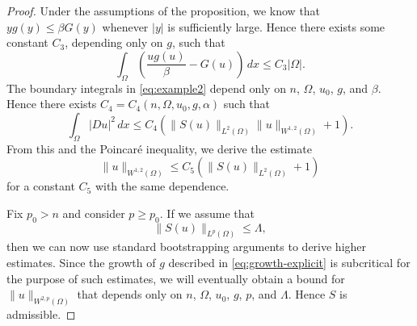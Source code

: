 \documentclass[a4paper]{article}
\theoremstyle{remark}
\begin{document}
\begin{proof}
Under the assumptions of the proposition, we know that $yg(y) \le \beta G(y)$ whenever $|y|$ is sufficiently large.
Hence there exists some constant $C_3$, depending only on $g$, such that
\[
\int_\Omega \left(\frac{u g(u)}{\beta} - G(u)\right) \, dx \le C_3 |\Omega|.
\]
The boundary integrals in \eqref{eq:example2} depend only on $n$, $\Omega$,
$u_0$, $g$, and $\beta$. Hence there exists $C_4 = C_4(n, \Omega, u_0, g, \alpha)$
such that
\[
\int_\Omega |Du|^2 \, dx \le C_4 \left(\|S(u)\|_{L^2(\Omega)} \|u\|_{W^{1, 2}(\Omega)} + 1\right).
\]
From this and the Poincar\'e inequality, we derive the estimate
\[
\|u\|_{W^{1, 2}(\Omega)} \le C_5\left(\|S(u)\|_{L^2(\Omega)} + 1\right)
\]
for a constant $C_5$ with the same dependence.

Fix $p_0 > n$ and consider $p \ge p_0$. If we assume that
\[
\|S(u)\|_{L^p(\Omega)} \le \Lambda,
\]
then we can now use standard bootstrapping arguments to derive higher estimates.
Since the growth of $g$ described in \eqref{eq:growth-explicit} is
subcritical for the purpose of such estimates, we will eventually obtain
a bound for $\|u\|_{W^{2, p}(\Omega)}$ that depends only on $n$, $\Omega$,
$u_0$, $g$, $p$, and $\Lambda$. Hence $S$ is admissible.
\end{proof}
\end{document}
